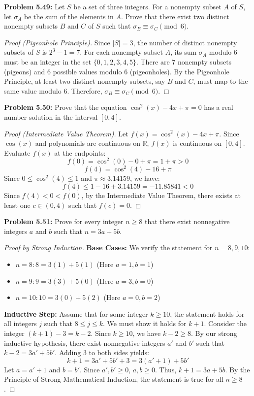 \documentclass[11pt, a4paper]{article}
\theoremstyle{definition}
\theoremstyle{remark}
\newcommand{\R}{\mathbb{R}}
\begin{document}
\textbf{Problem 5.49:} Let $S$ be a set of three integers. For a nonempty subset $A$ of $S$, let $\sigma_A$ be the sum of the elements in $A$. Prove that there exist two distinct nonempty subsets $B$ and $C$ of $S$ such that $\sigma_B \equiv \sigma_C \pmod 6$.
\begin{proof}[Proof (Pigeonhole Principle)]
    Since $|S| = 3$, the number of distinct nonempty subsets of $S$ is $2^3 - 1 = 7$.
    For each nonempty subset $A$, its sum $\sigma_A$ modulo 6 must be an integer in the set $\{0, 1, 2, 3, 4, 5\}$.
    There are 7 nonempty subsets (pigeons) and 6 possible values modulo 6 (pigeonholes). 
    By the Pigeonhole Principle, at least two distinct nonempty subsets, say $B$ and $C$, must map to the same value modulo 6. 
    Therefore, $\sigma_B \equiv \sigma_C \pmod 6$.
\end{proof}

\textbf{Problem 5.50:} Prove that the equation $\cos^2(x) - 4x + \pi = 0$ has a real number solution in the interval $[0, 4]$.
\begin{proof}[Proof (Intermediate Value Theorem)]
    Let $f(x) = \cos^2(x) - 4x + \pi$. Since $\cos(x)$ and polynomials are continuous on $\R$, $f(x)$ is continuous on $[0, 4]$.
    Evaluate $f(x)$ at the endpoints:
    \[ f(0) = \cos^2(0) - 0 + \pi = 1 + \pi > 0 \]
    \[ f(4) = \cos^2(4) - 16 + \pi \]
    Since $0 \le \cos^2(4) \le 1$ and $\pi \approx 3.14159$, we have:
    \[ f(4) \le 1 - 16 + 3.14159 = -11.85841 < 0 \]
    Since $f(4) < 0 < f(0)$, by the Intermediate Value Theorem, there exists at least one $c \in (0, 4)$ such that $f(c) = 0$.
\end{proof}

\textbf{Problem 5.51:} Prove for every integer $n \ge 8$ that there exist nonnegative integers $a$ and $b$ such that $n = 3a + 5b$.
\begin{proof}[Proof by Strong Induction]
    \textbf{Base Cases:} We verify the statement for $n=8, 9, 10$:
    \begin{itemize}
        \item $n=8: 8 = 3(1) + 5(1)$ (Here $a=1, b=1$)
        \item $n=9: 9 = 3(3) + 5(0)$ (Here $a=3, b=0$)
        \item $n=10: 10 = 3(0) + 5(2)$ (Here $a=0, b=2$)
    \end{itemize}
    \textbf{Inductive Step:} Assume that for some integer $k \ge 10$, the statement holds for all integers $j$ such that $8 \le j \le k$. We must show it holds for $k+1$.
    Consider the integer $(k+1) - 3 = k - 2$. Since $k \ge 10$, we have $k - 2 \ge 8$. 
    By our strong inductive hypothesis, there exist nonnegative integers $a'$ and $b'$ such that $k - 2 = 3a' + 5b'$.
    Adding 3 to both sides yields:
    \[ k + 1 = 3a' + 5b' + 3 = 3(a'+1) + 5b' \]
    Let $a = a'+1$ and $b = b'$. Since $a', b' \ge 0$, $a, b \ge 0$. Thus, $k+1 = 3a + 5b$. 
    By the Principle of Strong Mathematical Induction, the statement is true for all $n \ge 8$.
\end{proof}
\end{document}

